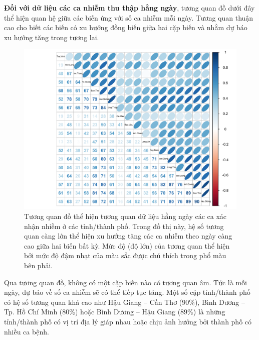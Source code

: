 \documentclass[../thesis.tex]{subfiles}
\begin{document}
\textbf{Đối với dữ liệu các ca nhiễm thu thập hằng ngày}, tương quan đồ dưới đây thể hiện quan hệ giữa các biến ứng với số ca nhiễm mỗi ngày. Tương quan thuận cao cho biết các biến có xu hướng đồng biến giữa hai cặp biến và nhằm dự báo xu hướng tăng trong tương lai.

\begin{Shaded}
	\begin{Highlighting}[]
\SpecialCharTok{::}\OtherTok{\textless{}{-}} \SpecialCharTok{\%\textgreater{}\%} \NormalTok{()}\NormalTok{, }
		 \NormalTok{, }
		 \NormalTok{, }
		\NormalTok{,}
		 \NormalTok{,}
		\NormalTok{)}
	\end{Highlighting}
\end{Shaded}

\begin{figure}[H]
	\centering
	\includegraphics[width=0.8\linewidth]{images/corr_case}
	\caption[Tương quan đồ thể hiện tương quan dữ liệu hằng ngày các ca xác nhận nhiễm ở các tỉnh/thành phố.]{Tương quan đồ thể hiện tương quan dữ liệu hằng ngày các ca xác nhận nhiễm ở các tỉnh/thành phố. Trong đồ thị này, hệ số tương quan càng lớn thể hiện xu hướng tăng các ca nhiễm theo ngày càng cao giữa hai biến bất kỳ. Mức độ (độ lớn) của tương quan thể hiện bởi mức độ đậm nhạt của màu sắc được chú thích trong phổ màu bên phải.}
	\label{fig:corrcase}
\end{figure}

Qua tương quan đồ, không có một cặp biến nào có tương quan âm. Tức là mỗi ngày, dự báo về số ca nhiễm sẽ có thể tiếp tục tăng. Một số cặp tỉnh/thành phố có hệ số tương quan khá cao như Hậu Giang -- Cần Thơ ($ 90\% $), Bình Dương -- Tp. Hồ Chí Minh ($ 80\% $) hoặc Bình Dương -- Hậu Giang ($ 89\% $) là những tỉnh/thành phố có vị trí địa lý giáp nhau hoặc chịu ảnh hưởng bởi thành phố có nhiều ca bệnh.
\end{document}
